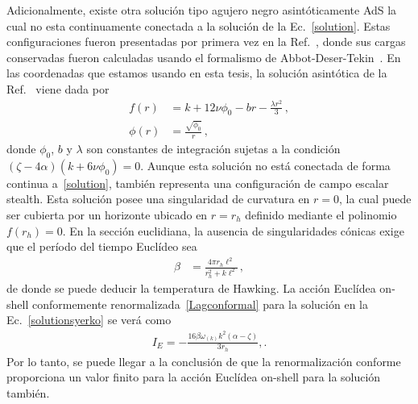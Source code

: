 \documentclass[../Main.tex]{subfiles}
\begin{document}
Adicionalmente, existe otra solución tipo agujero negro asintóticamente AdS la cual no esta continuamente conectada a la solución de la Ec.~\eqref{solution}. Estas configuraciones fueron presentadas por primera vez en la Ref.~\cite{Herrera:2017ztd}, donde sus cargas conservadas fueron calculadas usando el formalismo de Abbot-Deser-Tekin~\cite{Abbott:1981ff,Deser:2002rt,Deser:2002jk,Deser:2003vh}. En las coordenadas que estamos usando en esta tesis, la solución asintótica de la Ref.~\cite{Herrera:2017ztd} viene dada por
\begin{subequations}\label{solutionsyerko}
\begin{align}
    f(r) &= k + 12\nu\phi_0 -br - \frac{\lambda r^2}{3}\,, \\
    \phi(r) &= \frac{\sqrt{\phi_0}}{r}\,,
\end{align}
\end{subequations}
donde $\phi_0$, $b$ y $\lambda$ son constantes de integración sujetas a la condición $(\zeta-4\alpha)(k+6\nu\phi_0)=0$. Aunque esta solución no está conectada de forma continua a~\eqref{solution}, también representa una configuración de campo escalar stealth. Esta solución posee una singularidad de curvatura en $r=0$, la cual puede ser cubierta por un horizonte ubicado en $r=r_h$ definido mediante el polinomio $f(r_h)=0$. En la sección euclidiana, la ausencia de singularidades cónicas exige que el período del tiempo Euclídeo sea
\begin{align}
    \beta &= \frac{4\pi r_h\ell^2}{r_h^2+k\ell^2}\,,
\end{align}
de donde se puede deducir la temperatura de Hawking. La acción Euclídea on-shell conformemente renormalizada~\eqref{Lagconformal} para la solución en la Ec.~\eqref{solutionsyerko} se verá como 
\begin{align}
I_E = -\frac{16\beta\omega_{(k)}k^2(\alpha-\zeta)}{3r_h},.
\end{align}
Por lo tanto, se puede llegar a la conclusión de que la renormalización conforme proporciona un valor finito para la acción Euclídea on-shell para la solución~\cite{Herrera:2017ztd} también. 


\biblio %
\end{document}
